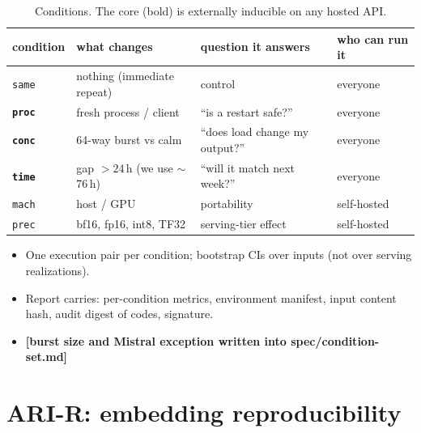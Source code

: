 \documentclass{article}
\newcommand{\todo}[1]{\textcolor{sTwo}{\textbf{[#1]}}}
\begin{document}
\begin{table}[h]\centering\footnotesize
\caption{Conditions. The core (bold) is externally inducible on any hosted API.}\label{tab:conditions}
\begin{tabular}{llll}
\toprule
condition & what changes & question it answers & who can run it \\
\midrule
\texttt{same} & nothing (immediate repeat) & control & everyone \\
\textbf{\texttt{proc}} & fresh process / client & ``is a restart safe?'' & everyone \\
\textbf{\texttt{conc}} & 64-way burst vs calm & ``does load change my output?'' & everyone \\
\textbf{\texttt{time}} & gap $>24$\,h (we use $\sim$76\,h) & ``will it match next week?'' & everyone \\
\texttt{mach} & host / GPU & portability & self-hosted \\
\texttt{prec} & bf16, fp16, int8, TF32 & serving-tier effect & self-hosted \\
\bottomrule
\end{tabular}
\end{table}
\begin{itemize}
  \item One execution pair per condition; bootstrap CIs over inputs (not over serving realizations).
  \item Report carries: per-condition metrics, environment manifest, input content hash, audit digest of codes, signature.
  \item \todo{burst size and Mistral exception written into spec/condition-set.md}
\end{itemize}

\section{ARI-R: embedding reproducibility}\label{sec:arir}
\end{document}
